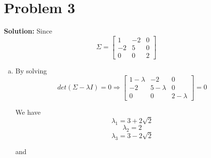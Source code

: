 \documentclass[11pt]{article}
\begin{document}
\section*{Problem 3}
\textbf{Solution:} 
	Since 
	\[\Sigma = 
	\begin{bmatrix}
		1 & -2 & 0\\
		-2 & 5 & 0\\
		0 & 0 & 2
	\end{bmatrix}
	\]
	\begin{enumerate}[(a)]
		\item By solving
		\[det(\Sigma - \lambda I) = 0 \Rightarrow
		\begin{bmatrix}
			1 - \lambda & -2 & 0\\
			-2 & 5 - \lambda & 0\\
			0 & 0 & 2 - \lambda
		\end{bmatrix} = 0
		 \]
		 
		 We have 
		 \[\lambda_1 = 3 + 2\sqrt{2}\]
		 \[\lambda_2 = 2\]
		 \[\lambda_3 = 3 - 2\sqrt{2}\]
		 
		 and
		 

\end{enumerate}
\end{document}
